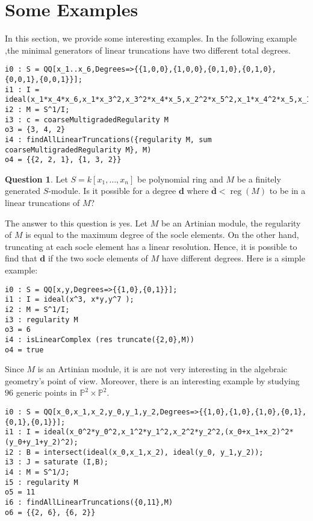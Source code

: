 \documentclass[11pt]{amsart}
\DeclareMathOperator{\reg}{reg}
\theoremstyle{definition}
\newtheorem{question}[thm]{Question}
\begin{document}
\section{Some Examples}
In this section, we provide some interesting examples.  In the following example ,the minimal generators of linear truncations have two different total degrees. 
  \begin{footnotesize}
 \begin{verbatim}
i0 : S = QQ[x_1..x_6,Degrees=>{{1,0,0},{1,0,0},{0,1,0},{0,1,0},{0,0,1},{0,0,1}}];
i1 : I = ideal(x_1*x_4*x_6,x_1*x_3^2,x_3^2*x_4*x_5,x_2^2*x_5^2,x_1*x_4^2*x_5,x_1*x_2^2*x_4);
i2 : M = S^1/I;
i3 : c = coarseMultigradedRegularity M
o3 = {3, 4, 2}
i4 : findAllLinearTruncations({regularity M, sum coarseMultigradedRegularity M}, M)
o4 = {{2, 2, 1}, {1, 3, 2}}
\end{verbatim}
\end{footnotesize}
\begin{question}
Let $S=k[x_1,\dots, x_n]$ be polynomial ring and $M$ be a finitely generated $S$-module. Is it possible for a degree $\textbf{d}$ where $\bar{\textbf{d}}<\reg(M)$ to be in a linear truncations of $M$?
\end{question}
The answer to this question is yes.  Let $M$ be an Artinian module, the regularity of $M$ is equal to the maximum degree of the socle elements. On the other hand, truncating at each socle element has a linear resolution. Hence, it is possible to find that $\textbf{d}$ if the two socle elements of $M$ have different degrees.  Here is a simple example: 
\begin{footnotesize}
 \begin{verbatim}
i0 : S = QQ[x,y,Degrees=>{{1,0},{0,1}}];
i1 : I = ideal(x^3, x*y,y^7 );
i2 : M = S^1/I;
i3 : regularity M
o3 = 6
i4 : isLinearComplex (res truncate({2,0},M))
o4 = true
\end{verbatim}
\end{footnotesize}
Since $M$ is an Artinian module, it is are not very interesting in the algebraic geometry's point of view. 
Moreover, there is an interesting example  by studying $96$ generic points in $\mathbb{P}^2\times \mathbb{P}^2$.
\begin{footnotesize}
 \begin{verbatim}
i0 : S = QQ[x_0,x_1,x_2,y_0,y_1,y_2,Degrees=>{{1,0},{1,0},{1,0},{0,1},{0,1},{0,1}}];
i1 : I = ideal(x_0^2*y_0^2,x_1^2*y_1^2,x_2^2*y_2^2,(x_0+x_1+x_2)^2*(y_0+y_1+y_2)^2);
i2 : B = intersect(ideal(x_0,x_1,x_2), ideal(y_0, y_1,y_2));
i3 : J = saturate (I,B);
i4 : M = S^1/J;
i5 : regularity M
o5 = 11
i6 : findAllLinearTruncations({0,11},M)
o6 = {{2, 6}, {6, 2}}
\end{verbatim}
\end{footnotesize}
\end{document}
